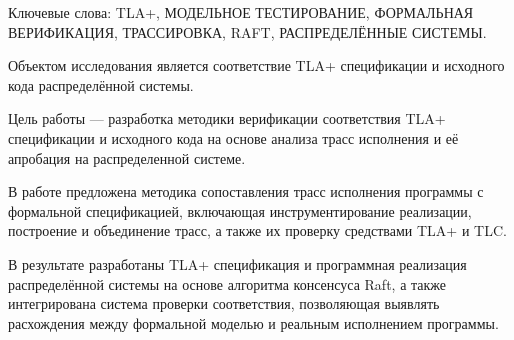 \abstract %

Ключевые слова: TLA+, МОДЕЛЬНОЕ ТЕСТИРОВАНИЕ, ФОРМАЛЬНАЯ ВЕРИФИКАЦИЯ,
ТРАССИРОВКА, RAFT, РАСПРЕДЕЛЁННЫЕ СИСТЕМЫ.

Объектом исследования является соответствие TLA+ спецификации и исходного кода
распределённой системы.

Цель работы --- разработка методики верификации соответствия TLA+ спецификации
и исходного кода на основе анализа трасс исполнения и её апробация на
распределенной системе.

В работе предложена методика сопоставления трасс исполнения программы с
формальной спецификацией, включающая инструментирование реализации, построение
и объединение трасс, а также их проверку средствами TLA+ и TLC.

В результате разработаны TLA+ спецификация и программная реализация
распределённой системы на основе алгоритма консенсуса Raft, а также
интегрирована система проверки соответствия, позволяющая выявлять расхождения
между формальной моделью и реальным исполнением программы.
